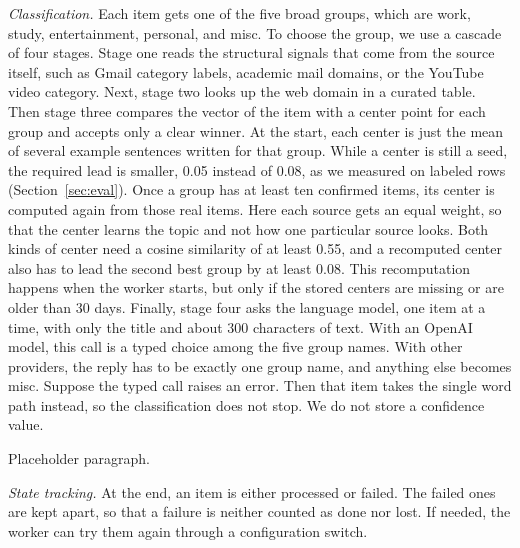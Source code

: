 \documentclass[conference]{IEEEtran}
\begin{document}
\textit{Classification.} Each item gets one of the five broad groups, which are work, study, entertainment, personal, and misc. To choose the group, we use a cascade of four stages. Stage one reads the structural signals that come from the source itself, such as Gmail category labels, academic mail domains, or the YouTube video category. Next, stage two looks up the web domain in a curated table. Then stage three compares the vector of the item with a center point for each group and accepts only a clear winner. At the start, each center is just the mean of several example sentences written for that group. While a center is still a seed, the required lead is smaller, 0.05 instead of 0.08, as we measured on labeled rows (Section~\ref{sec:eval}). Once a group has at least ten confirmed items, its center is computed again from those real items. Here each source gets an equal weight, so that the center learns the topic and not how one particular source looks. Both kinds of center need a cosine similarity of at least 0.55, and a recomputed center also has to lead the second best group by at least 0.08. This recomputation happens when the worker starts, but only if the stored centers are missing or are older than 30 days. Finally, stage four asks the language model, one item at a time, with only the title and about 300 characters of text. With an OpenAI model, this call is a typed choice among the five group names. With other providers, the reply has to be exactly one group name, and anything else becomes misc. Suppose the typed call raises an error. Then that item takes the single word path instead, so the classification does not stop. We do not store a confidence value.

Placeholder paragraph.

\textit{State tracking.} At the end, an item is either processed or failed. The failed ones are kept apart, so that a failure is neither counted as done nor lost. If needed, the worker can try them again through a configuration switch.
\end{document}
